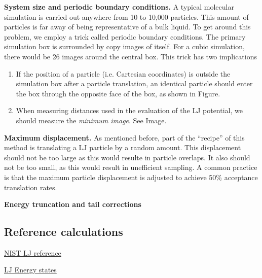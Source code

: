 \documentclass[aip,jcp,preprint,superscriptaddress,floatfix]{revtex4-1}
\begin{document}
\textbf{System size and periodic boundary conditions.} A typical molecular 
simulation is carried out anywhere from 
10 to 10,000 particles. This amount of particles is far away of being
representative of a bulk liquid. To get around this problem, we employ a trick
called
periodic boundary conditions. The primary simulation box is surrounded
by copy images of itself. For a cubic simulation, there would be 26 
images around the central box. This trick has two implications
\begin{enumerate}
	\item If the position of a particle (i.e. Cartesian coordinates) is
		outside the simulation box after a particle translation, 
		an identical particle should enter the box through the
		opposite face of the box, as shown in Figure.
	\item When measuring distances used in the evaluation of the LJ
		potential, we should measure the \textit{minimum
		image}. See Image.
\end{enumerate}

\textbf{Maximum displacement.} As mentioned before, part of the ``recipe''
of this method is translating a LJ particle by a random amount. This
displacement should not be too large as this would resulte in particle overlaps. It also should not be too small, as this would result in unefficient sampling.
A common practice is that the maximum particle displacement is adjusted
to achieve 50\% acceptance translation rates. 

\textbf{Energy truncation and tail corrections}


\subsection{Reference calculations}

\href{https://mmlapps.nist.gov/srs/LJ_PURE/mc.htm}{NIST LJ reference}

\href{https://www.nist.gov/mml/csd/chemical-informatics-research-group/lennard-jones-fluid-reference-calculations}{LJ Energy states}

\newpage
%
%
%
\end{document}
